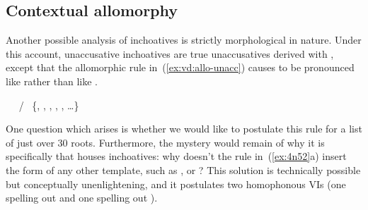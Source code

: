 \begin{exe}
\begin{xlist}
\begin{xlist}
\begin{exe}
\begin{exe}
\begin{xlist}
\begin{exe}
\begin{xlist}
\begin{exe}
\begin{xlist}
\begin{xlist}
\begin{exe}
\begin{xlist}
\begin{exe}
\begin{xlist}
\begin{exe}
\begin{exe}
\begin{exe}
\begin{xlist}
\begin{exe}
\begin{exe}
\begin{xlist}
\begin{xlist}
\begin{exe}
\begin{xlist}
\begin{exe}
\begin{exe}
\begin{exe}
\begin{xlist}
\begin{exe}
\begin{exe}
\begin{xlist}
\begin{exe}
\begin{xlist}
\begin{exe}
\begin{xlist}
\begin{exe}
\begin{xlist}
\begin{exe}
\begin{exe}
\begin{xlist}
\begin{exe}
\begin{exe}
\begin{xlist}
\begin{xlist}
\begin{exe}
\begin{xlist}
\begin{xlist}
\begin{exe}
\begin{xlist}
\begin{exe}
\begin{xlist}
\begin{exe}
\begin{xlist}
\begin{exe}
\begin{xlist}
\begin{exe}
\begin{exe}
\begin{exe}
\begin{exe}
\begin{xlist}
\begin{exe}
\begin{exe}
\begin{xlist}
\begin{xlist}
\begin{exe}
\begin{exe}
\begin{xlist}
\begin{exe}
\begin{xlist}
\begin{exe}
\begin{xlist}
	\subsection{Contextual allomorphy}
Another possible analysis of inchoatives is strictly morphological in nature. Under this account, unaccusative inchoatives are true unaccusatives derived with {\vz}, except that the allomorphic rule in~(\ref{ex:vd:allo-unacc}) causes {\vz} to be pronounced like {\thif} rather than like {\tnif}.
 \begin{exe}
 \ex  \label{ex:4n52}
 \begin{xlist} 
   \ex  \vz~\lra~{\thif} / \trace~\{, , , , , \dots \}\label{ex:vd:allo-unacc} 
   \ex  \vz~\lra~{\tnif} 
 \z
\z 

One question which arises is whether we would like to postulate this rule for a list of just over 30 roots. Furthermore, the mystery would remain of why it is specifically {\thif} that houses inchoatives: why doesn't the rule in~(\ref{ex:4n52}a) insert the form of any other template, such as {\tkal}, {\tnif} or {\tpie}? This solution is technically possible but conceptually unenlightening, and it postulates two homophonous VIs {\thif} (one spelling out {\vd} and one spelling out {\vz}).


\end{xlist}
\end{exe}
\end{xlist}
\end{exe}
\end{xlist}
\end{exe}
\end{xlist}
\end{exe}
\end{exe}
\end{xlist}
\end{xlist}
\end{exe}
\end{exe}
\end{xlist}
\end{exe}
\end{exe}
\end{exe}
\end{exe}
\end{xlist}
\end{exe}
\end{xlist}
\end{exe}
\end{xlist}
\end{exe}
\end{xlist}
\end{exe}
\end{xlist}
\end{xlist}
\end{exe}
\end{xlist}
\end{xlist}
\end{exe}
\end{exe}
\end{xlist}
\end{exe}
\end{exe}
\end{xlist}
\end{exe}
\end{xlist}
\end{exe}
\end{xlist}
\end{exe}
\end{xlist}
\end{exe}
\end{exe}
\end{xlist}
\end{exe}
\end{exe}
\end{exe}
\end{xlist}
\end{exe}
\end{xlist}
\end{xlist}
\end{exe}
\end{exe}
\end{xlist}
\end{exe}
\end{exe}
\end{exe}
\end{xlist}
\end{exe}
\end{xlist}
\end{exe}
\end{xlist}
\end{xlist}
\end{exe}
\end{xlist}
\end{exe}
\end{xlist}
\end{exe}
\end{exe}
\end{xlist}
\end{xlist}
\end{exe}
